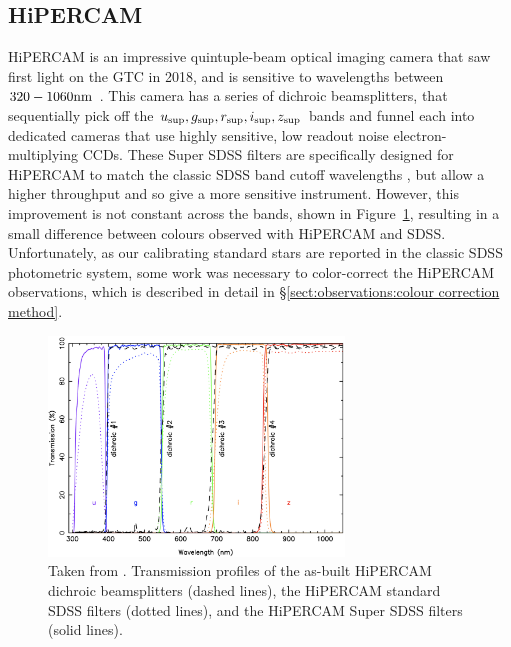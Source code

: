 \subsection{HiPERCAM}

HiPERCAM is an impressive quintuple-beam optical imaging camera that saw first light on the GTC in 2018, and is sensitive to wavelengths between $320 - 1060 \rm nm$ \citep{dhillon2021}. 
This camera has a series of dichroic beamsplitters, that sequentially pick off the $u_{\rm sup}, g_{\rm sup}, r_{\rm sup}, i_{\rm sup}, z_{\rm sup}$ bands and funnel each into dedicated cameras that use highly sensitive, low readout noise electron-multiplying CCDs. 
These Super SDSS filters are specifically designed for HiPERCAM to match the classic SDSS band cutoff wavelengths \citep{fukugita1996}, but allow a higher throughput and so give a more sensitive instrument. 
However, this improvement is not constant across the bands, shown in Figure~\ref{fig:observations:superSDSS throughput comparison}, resulting in a small difference between colours observed with HiPERCAM and SDSS. 
Unfortunately, as our calibrating standard stars are reported in the classic SDSS photometric system, some work was necessary to color-correct the HiPERCAM observations, which is described in detail in \S\ref{sect:observations:colour correction method}.
\begin{figure}
    \centering
    \includegraphics[width=0.7\textwidth]{figures/observations/plot_dichs_supersdss_asbuilt_v3.png}
    \caption{Taken from \citet{dhillon2021}. Transmission profiles of the as-built HiPERCAM dichroic beamsplitters (dashed lines), the HiPERCAM standard SDSS filters (dotted lines), and the HiPERCAM Super SDSS filters (solid
    lines).}
    \label{fig:observations:superSDSS throughput comparison}
\end{figure}

